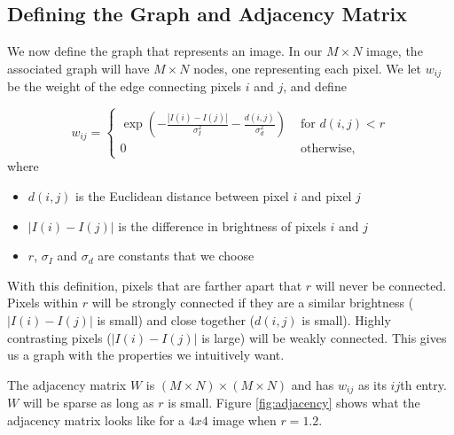 \subsection*{Defining the Graph and Adjacency Matrix}

We now define the graph that represents an image. In our $M \times N$ image, the associated graph will have $M \times N$ nodes, one representing each pixel. We let $w_{ij}$ be the weight of the edge connecting pixels $i$ and $j$, and define

 \begin{equation}
 \label{eq:adjacency}
w_{ij} = \begin{cases} \exp(-\frac{|I(i) - I(j)|}{\sigma_I^2}-\frac{d(i,j)}{\sigma_d^2}) & \mbox{ for $d(i,j) < r$} \\ 0 & \mbox{ otherwise,} \end{cases}
\end{equation}
where
\begin{itemize}
	\item$d(i,j)$ is the Euclidean distance between pixel $i$ and pixel $j$
	\item $|I(i) - I(j)|$ is the difference in brightness of pixels $i$ and $j$
	\item $r$, $\sigma_I$ and $\sigma_d$ are constants that we choose
\end{itemize}

With this definition, pixels that are farther apart that $r$ will never be connected. 
Pixels within $r$ will be strongly connected if they are a similar brightness ($|I(i) - I(j)|$ is small) and close together ($d(i,j)$ is small).
Highly contrasting pixels ($|I(i) - I(j)|$ is large) will be weakly connected. 
This gives us a graph with the properties we intuitively want.

The adjacency matrix $W$ is $(M \times N) \times (M \times N)$ and has $w_{ij}$ as its $ij$th entry. 
$W$ will be sparse as long as $r$ is small. 
Figure \ref{fig:adjacency} shows what the adjacency matrix looks like for a $4x4$ image when $r=1.2$.

